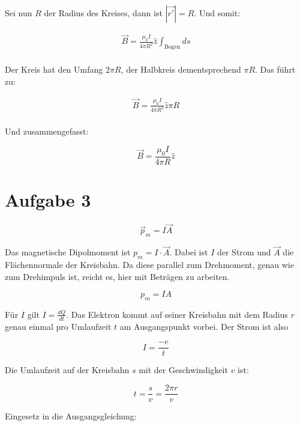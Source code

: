 \documentclass[a4paper,german,12pt,smallheadings]{scrartcl}
\begin{document}
Sei nun $R$ der Radius des Kreises, dann ist $|\vec{r'}| = R$. Und somit:

\begin{align}
  \vec{B} = \frac{\mu_0 I}{4 \pi R^2} \widehat{z}\int_{\text{Bogen}} ds \\
\end{align}

Der Kreis hat den Umfang $2 \pi R$, der Halbkreis dementsprechend $\pi R$. Das führt zu:

\begin{align}
  \vec{B} = \frac{\mu_0 I}{4 \pi R^2} \widehat{z} \pi R \\
\end{align}

Und zusammengefasst:

\begin{equation}
  \vec{B} = \frac{\mu_0 I}{4 \pi R} \widehat{z}
\end{equation}

\section*{Aufgabe 3}

\begin{equation}
  \vec{p}_m = I \vec{A}
\end{equation}

Das magnetische Dipolmoment ist $p_m = I \cdot \vec{A}$. Dabei ist $I$ der
Strom und $\vec{A}$ die Flächennormale der Kreisbahn. Da diese parallel zum
Drehmoment, genau wie zum Drehimpuls ist, reicht es, hier mit Beträgen zu
arbeiten.

\begin{equation}
  p_m = I A
\end{equation}

Für $I$ gilt $I = \frac{dQ}{dt}$. Das Elektron kommt auf seiner Kreisbahn mit
dem Radius $r$ genau einmal pro Umlaufzeit $t$ am Ausgangspunkt vorbei. Der
Strom ist also

\begin{equation}
  I = \frac{-e}{t}
\end{equation}

Die Umlaufzeit auf der Kreisbahn $s$ mit der Geschwindigkeit $v$ ist:

\begin{equation}
  t = \frac{s}{v} = \frac{2 \pi r}{v}
\end{equation}

Eingesetz in die Ausgangsgleichung:
\end{document}
